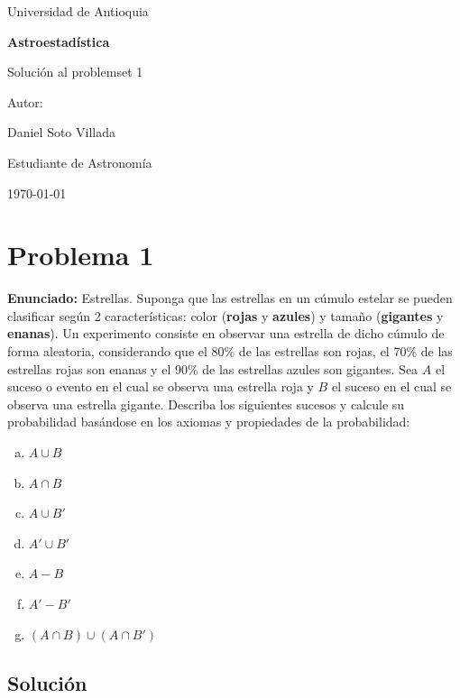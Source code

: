\documentclass[a4paper]{article}
\begin{document}
\begin{titlepage}
  \centering
  {\Large Universidad de Antioquia\par}
  \vspace{2cm}
  {\huge\bfseries Astroestadística\par}
  \vspace{0.4cm}
  {\Large Solución al problemset 1 \par}
  \vspace{2.5cm}
  {\large Autor:\par}
  \vspace{0.2cm}
  {\large Daniel Soto Villada\par}
  {\large Estudiante de Astronomía\par}
  \vfill
  {\large \today\par}
\end{titlepage}

\newpage
\tableofcontents
\newpage


\section{Problema 1}
\textbf{Enunciado:}
Estrellas. Suponga que las estrellas en un cúmulo estelar se pueden clasificar según 2 características: color (\textbf{rojas} y \textbf{azules}) y tamaño (\textbf{gigantes} y \textbf{enanas}). Un experimento consiste en observar una estrella de dicho cúmulo de forma aleatoria, considerando que el 80\% de las estrellas son rojas, el 70\% de las estrellas rojas son enanas y el 90\% de las estrellas azules son gigantes. Sea $A$ el suceso o evento en el cual se observa una estrella roja y $B$ el suceso en el cual se observa una estrella gigante. Describa los siguientes sucesos y calcule su probabilidad basándose en los axiomas y propiedades de la probabilidad:
\begin{enumerate}[a.]
    \item $A \cup B$
    \item $A \cap B$
    \item $A \cup B'$
    \item $A' \cup B'$
    \item $A - B$
    \item $A' - B'$
    \item $(A \cap B) \cup (A \cap B')$
\end{enumerate}

\subsection*{Solución}
\end{document}
